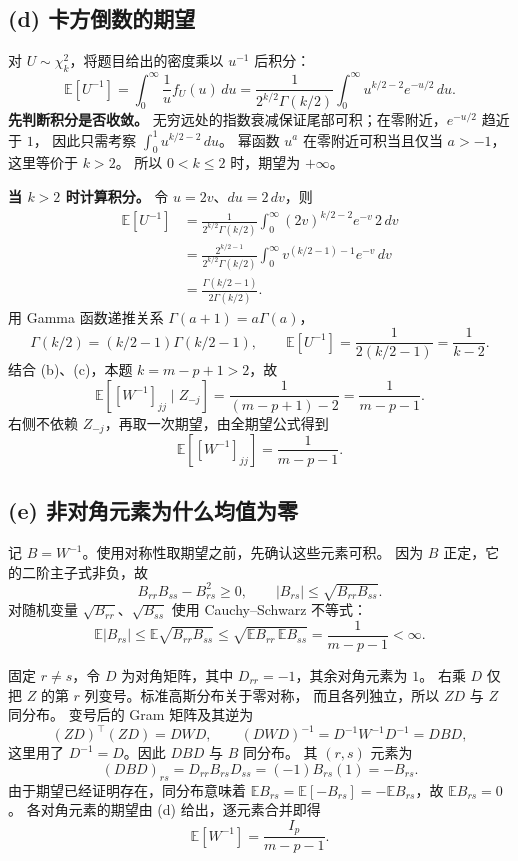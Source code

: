 \documentclass[UTF8,a4paper,11pt,fontset=fandol]{ctexart}
\newcommand{\E}{\mathbb E}
\begin{document}
\subsection*{(d) 卡方倒数的期望}
对 $U\sim\chi_k^2$，将题目给出的密度乘以 $u^{-1}$ 后积分：
\[
 \E[U^{-1}]=\int_0^\infty\frac1u f_U(u)\,du
 =\frac1{2^{k/2}\Gamma(k/2)}
 \int_0^\infty u^{k/2-2}e^{-u/2}\,du.
\]
\textbf{先判断积分是否收敛。}
无穷远处的指数衰减保证尾部可积；在零附近，$e^{-u/2}$ 趋近于 $1$，
因此只需考察 $\int_0^1u^{k/2-2}\,du$。
幂函数 $u^a$ 在零附近可积当且仅当 $a>-1$，这里等价于 $k>2$。
所以 $0<k\leq2$ 时，期望为 $+\infty$。

\textbf{当 $k>2$ 时计算积分。}
令 $u=2v$、$du=2\,dv$，则
\begin{align*}
 \E[U^{-1}]
 &=\frac1{2^{k/2}\Gamma(k/2)}
   \int_0^\infty(2v)^{k/2-2}e^{-v}\,2\,dv\\
 &=\frac{2^{k/2-1}}{2^{k/2}\Gamma(k/2)}
   \int_0^\infty v^{(k/2-1)-1}e^{-v}\,dv\\
 &=\frac{\Gamma(k/2-1)}{2\Gamma(k/2)}.
\end{align*}
用 Gamma 函数递推关系 $\Gamma(a+1)=a\Gamma(a)$，
\[
 \Gamma(k/2)=(k/2-1)\Gamma(k/2-1),
 \qquad \E[U^{-1}]=\frac1{2(k/2-1)}=\frac1{k-2}.
\]
结合 (b)、(c)，本题 $k=m-p+1>2$，故
\[
 \E[[W^{-1}]_{jj}\mid Z_{-j}]=\frac1{(m-p+1)-2}
 =\frac1{m-p-1}.
\]
右侧不依赖 $Z_{-j}$，再取一次期望，由全期望公式得到
\[
 \boxed{\E[[W^{-1}]_{jj}]=\frac1{m-p-1}.}
\]

\subsection*{(e) 非对角元素为什么均值为零}
记 $B=W^{-1}$。使用对称性取期望之前，先确认这些元素可积。
因为 $B$ 正定，它的二阶主子式非负，故
\[
 B_{rr}B_{ss}-B_{rs}^2\geq0,
 \qquad |B_{rs}|\leq\sqrt{B_{rr}B_{ss}}.
\]
对随机变量 $\sqrt{B_{rr}}$、$\sqrt{B_{ss}}$ 使用 Cauchy--Schwarz 不等式：
\[
 \E|B_{rs}|\leq\E\sqrt{B_{rr}B_{ss}}
 \leq\sqrt{\E B_{rr}\,\E B_{ss}}
 =\frac1{m-p-1}<\infty.
\]

固定 $r\ne s$，令 $D$ 为对角矩阵，其中 $D_{rr}=-1$，其余对角元素为 $1$。
右乘 $D$ 仅把 $Z$ 的第 $r$ 列变号。标准高斯分布关于零对称，
而且各列独立，所以 $ZD$ 与 $Z$ 同分布。
变号后的 Gram 矩阵及其逆为
\[
 (ZD)^\top(ZD)=DWD,\qquad
 (DWD)^{-1}=D^{-1}W^{-1}D^{-1}=DBD,
\]
这里用了 $D^{-1}=D$。因此 $DBD$ 与 $B$ 同分布。
其 $(r,s)$ 元素为
\[
 (DBD)_{rs}=D_{rr}B_{rs}D_{ss}=(-1)B_{rs}(1)=-B_{rs}.
\]
由于期望已经证明存在，同分布意味着
$\E B_{rs}=\E[-B_{rs}]=-\E B_{rs}$，故 $\E B_{rs}=0$。
各对角元素的期望由 (d) 给出，逐元素合并即得
\[
 \boxed{\E[W^{-1}]=\frac{I_p}{m-p-1}.}
\]
\end{document}
